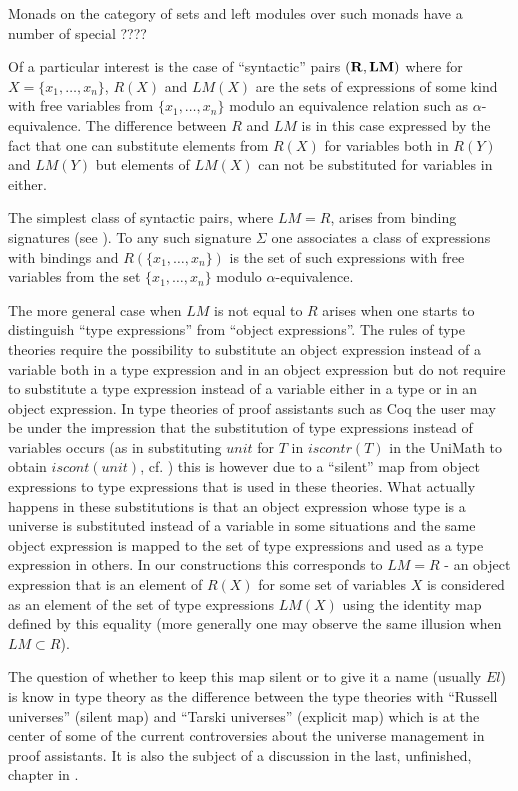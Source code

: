 \documentclass[11pt]{article}
\newcommand{\rr}{{\bf R}}
\newcommand{\lm}{{\bf LM}}
\begin{document}
Monads on the category of sets and left modules over such monads have a number of special ????


Of a particular interest is the case of ``syntactic'' pairs $(\rr,\lm)$ where for $X=\{x_1,\dots,x_n\}$, $R(X)$ and $LM(X)$ are the sets of expressions of some kind with free variables from $\{x_1,\dots,x_n\}$ modulo an equivalence relation such as $\alpha$-equivalence. The difference between $R$ and $LM$ is in this case expressed by the fact that one can substitute elements from $R(X)$ for variables both in $R(Y)$ and $LM(Y)$ but elements of $LM(X)$ can not be substituted for variables in either. 

The simplest class of syntactic pairs, where $LM=R$, arises from binding signatures (see \cite[p.228]{HM2007}). To any such signature $\Sigma$ one associates a class of expressions with bindings and $R(\{x_1,\dots,x_n\})$ is the set of such expressions with free variables from the set $\{x_1,\dots,x_n\}$ modulo $\alpha$-equivalence.  

The more general case when $LM$ is not equal to $R$ arises when one starts to distinguish ``type expressions'' from ``object expressions''. The rules of type theories require the possibility to substitute an object expression instead of a variable both in a type expression and in an object expression but do not require to substitute a type expression instead of a variable either in a type or in an object expression. In type theories of proof assistants such as Coq the user may be under the impression that the substitution of type expressions instead of variables occurs (as in substituting $unit$ for $T$ in $iscontr(T)$ in the UniMath to obtain $iscont(unit)$, cf. \cite{UniMath2015}) this is however due to a ``silent'' map from object expressions to type expressions that is used in these theories. What actually happens in these substitutions is that an object expression whose type is a universe is substituted instead of a variable in some situations and the same object expression is mapped to the set of type expressions and used as a type expression in others. In our constructions this corresponds to $LM=R$ - an object expression that is an element of $R(X)$ for some set of variables $X$ is considered as an element of the set of type expressions $LM(X)$ using the identity map defined by this equality (more generally one may observe the same illusion when $LM\subset R$). 

The question of whether to keep this map silent or to give it a name (usually $El$) is know in type theory as the difference between the type theories with ``Russell universes'' (silent map) and ``Tarski universes'' (explicit map) which is at the center of some of the current controversies about the universe management in proof assistants. It is also the subject of a discussion in the last, unfinished, chapter in \cite{Bibliopolis}. 
\end{document}
